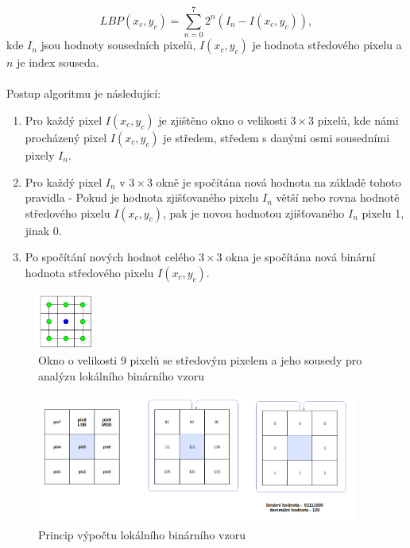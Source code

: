 $$LBP(x_c,y_c) = \sum_{n=0}^{7}2^n(I_n-I(x_c,y_c)),$$
kde $I_n$ jsou hodnoty sousedních pixelů, $I(x_c,y_c)$ je hodnota středového pixelu a $n$ je index souseda.\\\\
Postup algoritmu je následující:\\
\begin{enumerate}
    \item Pro každý pixel $I(x_c,y_c)$ je zjištěno okno o velikosti $3\times3$ pixelů, kde námi procházený pixel $I(x_c,y_c)$ je středem, středem s danými osmi sousedními pixely $I_n$.
    \item Pro každý pixel $I_n$ v $3\times3$ okně je spočítána nová hodnota na základě tohoto pravidla - Pokud je hodnota zjišťovaného pixelu $I_n$ větší nebo rovna hodnotě středového pixelu $I(x_c,y_c)$, pak je novou hodnotou zjišťovaného $I_n$ pixelu 1, jinak 0.
    \item Po spočítání nových hodnot celého $3\times3$ okna je spočítána nová binární hodnota středového pixelu $I(x_c,y_c)$.
\end{enumerate}

\begin{figure}[!htbp]
    \centering
    \includegraphics[width=70px]{obrazky-figures/lbpn.png}
    \caption{Okno o velikosti 9 pixelů se středovým pixelem a jeho sousedy pro analýzu lokálního binárního vzoru \cite{GragnanielloStudy}}
\end{figure}

\begin{figure}[!htbp]
    \centering
    \includegraphics[width=400px]{obrazky-figures/lbpprincip.png}
    \caption{Princip výpočtu lokálního binárního vzoru}
\end{figure}

